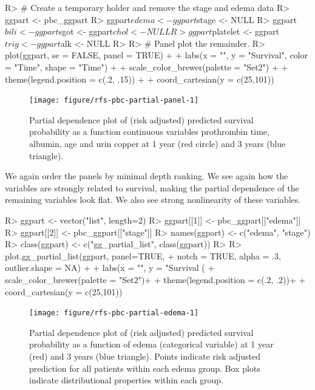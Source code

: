 \documentclass[nojss]{jss}\usepackage[]{graphicx}\usepackage[]{color}
\begin{document}
\begin{Schunk}
\begin{Sinput}
R> # Create a temporary holder and remove the stage and edema data
R> ggpart <- pbc_ggpart
R> ggpart$edema <- ggpart$stage <- NULL
R> ggpart$bili <- ggpart$sgot <- ggpart$chol <- NULL
R> ggpart$platelet <- ggpart$trig <- ggpart$alk <- NULL
R> 
R> # Panel plot the remainder.
R> plot(ggpart, se = FALSE, panel = TRUE) + 
+   labs(x = "", y = "Survival", color = "Time", shape = "Time") +
+   scale_color_brewer(palette = "Set2") + 
+   theme(legend.position = c(.2, .15)) + 
+   coord_cartesian(y = c(25,101))
\end{Sinput}
\begin{figure}[!htpb]

{\centering \texttt{[image: figure/rfs-pbc-partial-panel-1]} 

}

\caption[Partial dependence plot of (risk adjusted) predicted survival probability as a function continuous variables prothrombin time, albumin, age and urin copper at 1 year (red circle) and 3 years (blue triangle)]{Partial dependence plot of (risk adjusted) predicted survival probability as a function continuous variables prothrombin time, albumin, age and urin copper at 1 year (red circle) and 3 years (blue triangle).\label{fig:pbc-partial-panel}}
\end{figure}
\end{Schunk}

We again order the panels by minimal depth ranking. We see again how the  variables are strongly related to survival, making the partial dependence of the remaining variables look flat. We also see strong nonlinearity of these variables.

\begin{Schunk}
\begin{Sinput}
R> ggpart <- vector("list", length=2)
R> ggpart[[1]] <- pbc_ggpart[["edema"]]
R> ggpart[[2]] <- pbc_ggpart[["stage"]]
R> names(ggpart) <- c("edema", "stage")
R> class(ggpart) <- c("gg_partial_list", class(ggpart))
R> 
R> plot.gg_partial_list(ggpart, panel=TRUE,
+                      notch = TRUE, alpha = .3, outlier.shape = NA) + 
+   labs(x = "", y = "Survival (%
+   scale_color_brewer(palette = "Set2")+
+   theme(legend.position = c(.2, .2))+
+   coord_cartesian(y = c(25,101))
\end{Sinput}
\begin{figure}[!htpb]

{\centering \texttt{[image: figure/rfs-pbc-partial-edema-1]} 

}

\caption[Partial dependence plot of (risk adjusted) predicted survival probability as a function of edema (categorical variable) at 1 year (red) and 3 years (blue triangle)]{Partial dependence plot of (risk adjusted) predicted survival probability as a function of edema (categorical variable) at 1 year (red) and 3 years (blue triangle). Points indicate risk adjusted prediction for all patients within each edema group. Box plots indicate distributional properties within each group.\label{fig:pbc-partial-edema}}
\end{figure}
\end{Schunk}
\end{document}
